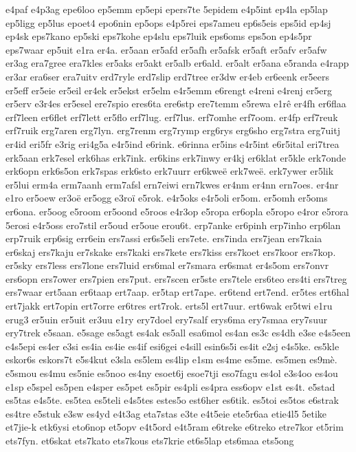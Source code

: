 {e4paf
e4p3ag
epe6loo
ep5emm
ep5epi
epers7te
5epidem
e4p5int
ep4la
ep5lap
ep5ligg
ep5lus
epoet4
epo6nin
ep5ops
e4p5rei
eps7ameu
ep6s5eis
eps5id
ep4sj
ep4sk
eps7kano
ep5ski
eps7kohe
ep4slu
eps7luik
eps6oms
eps5on
ep4s5pr
eps7waar
ep5uit
e1ra
er4a.
er5aan
er5afd
er5afh
er5afsk
er5aft
er5afv
er5afw
er3ag
era7gree
era7kles
er5aks
er5akt
er5alb
er6ald.
er5alt
er5ana
e5randa
e4rapp
er3ar
era6ser
era7uitv
erd7ryle
erd7slip
erd7tree
er3dw
er4eb
er6eenk
er5eers
er5eff
er5eie
er5eil
er4ek
er5ekst
er5elm
e4r5emm
e6rengt
e4reni
e4renj
er5erg
er5erv
e3r4es
er5esel
ere7spio
eres6ta
ere6stp
ere7temm
e5rewa
e1rê
er4fh
er6flaa
erf7leen
er6flet
erf7lett
er5flo
erf7lug.
erf7lus.
erf7omhe
erf7oom.
er4fp
erf7reuk
erf7ruik
erg7aren
erg7lyn.
erg7renm
erg7rymp
erg6rys
erg6sho
erg7stra
erg7uitj
er4id
eri5fr
e3rig
eri4g5a
e4r5ind
e6rink.
e6rinna
er5ins
e4r5int
e6r5ital
eri7trea
erk5aan
erk7esel
erk6has
erk7ink.
er6kins
erk7inwy
er4kj
er6klat
er5kle
erk7onde
erk6opn
erk6s5on
erk7spas
erk6sto
erk7uurr
er6kweë
erk7weë.
erk7ywer
er5lik
er5lui
erm4a
erm7aanh
erm7afsl
ern7eiwi
ern7kwes
er4nm
er4nn
ern7oes.
er4nr
e1ro
er5oew
er3oë
er5ogg
e3roï
e5rok.
e4r5oks
e4r5oli
er5om.
er5omh
er5oms
er6ona.
er5oog
e5room
er5oond
e5roos
e4r3op
e5ropa
er6opla
e5ropo
e4ror
e5rora
5erosi
e4r5oss
ero7stil
er5oud
er5oue
erou6t.
erp7anke
er6pinh
erp7inho
erp6lan
erp7ruik
erp6sig
err6ein
ers7assi
er6s5eli
ers7ete.
ers7inda
ers7jean
ers7kaia
er6skaj
ers7kaju
er7skake
ers7kaki
ers7kete
ers7kiss
ers7koet
ers7koor
ers7kop.
er5sky
ers7less
ers7lone
ers7luid
ers6mal
er7smara
er6smat
er4s5om
ers7onvr
ers6opn
ers7ower
ers7pien
ers7put.
ers7scen
er5ste
ers7tele
ers6teo
ers4ti
ers7treg
ers7waar
ert5aan
er6taap
ert7aap.
er5tap
ert7ape.
er6tend
ert7end.
er5tes
ert6hal
ert7jakk
ert7opin
ert7orre
er6tres
ert7rok.
erts5l
ert7uur.
ert6wak
er5twi
e1ru
erug3
er5uin
er5uit
er3uu
e1ry
ery7doel
ery7salf
erys6ma
ery7smaa
ery7suur
ery7trek
e5saan.
e5sage
es5agt
es4ak
es5all
esa6mol
es4an
es3c
es4dh
e3se
e4s5een
e4s5epi
es4er
e3si
es4ia
es4ie
es4if
esi6gei
e4sill
esin6s5i
es4it
e2sj
e4s5ke.
es5kle
eskor6s
eskors7t
e5s4kut
e3sla
es5lem
es4lip
e1sm
es4me
es5me.
es5men
es9mè.
e5smou
es4mu
es5nie
es5noo
es4ny
esoet6j
esoe7tji
eso7fagu
es4ol
e3s4oo
es4ou
e1sp
e5spel
es5pen
e4sper
es5pet
es5pir
es4pli
es4pra
ess6opv
e1st
es4t.
e5stad
es5tas
e4s5te.
es5tea
es5teli
e4s5tes
estes5o
est6her
es6tik.
es5toi
es5tos
e6strak
es4tre
e5stuk
e3sw
es4yd
e4t3ag
eta7stas
e3te
e4t5eie
ete5r6aa
etie4l5
5etike
et7jie-k
etk6ysi
eto6nop
et5opv
e4t5ord
e4t5ram
e6treke
e6treko
etre7kor
et5rim
ets7fyn.
et6skat
ets7kato
ets7kous
ets7krie
et6s5lap
ets6maa
ets5ong
}
